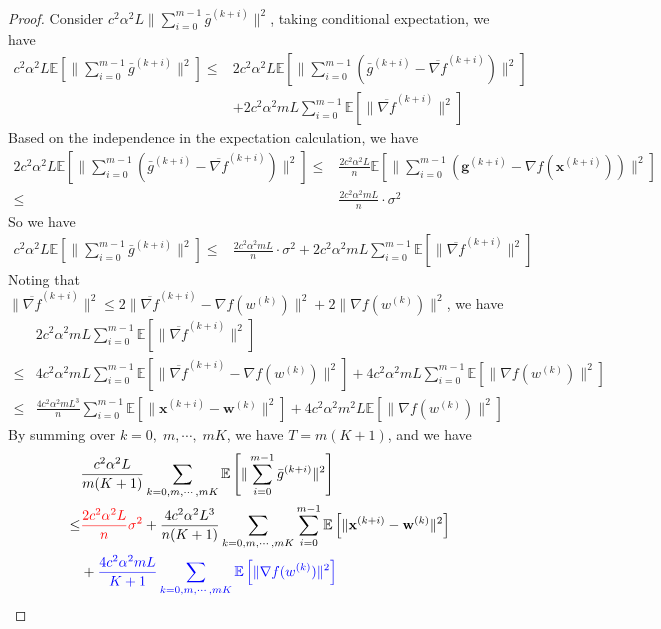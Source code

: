 \documentclass{article}
\newcommand{\vg}{{\mathbf{g}}}
\newcommand{\vw}{{\mathbf{w}}}
\newcommand{\vx}{{\mathbf{x}}}
\newcommand{\EE}[1]{\mathbb{E}\left[#1\right]}
\newcommand{\norm}[1]{\| #1 \|}
\begin{document}
\begin{proof}
Consider $c^2\alpha^2L\norm{\sum_{i=0}^{m-1}\bar{g}^{(k+i)}}^2$, taking conditional expectation, we have
\begin{align*}
  c^2\alpha^2L\EE{\norm{\sum_{i=0}^{m-1}\bar{g}^{(k+i)}}^2}\leq& 2c^2\alpha^2L\EE{\norm{\sum_{i=0}^{m-1}(\bar{g}^{(k+i)}-\overline{\nabla f}^{(k+i)})}^2}\\&+2c^2\alpha^2m L\sum_{i=0}^{m-1}\EE{\norm{\overline{\nabla f}^{(k+i)}}^2}
\end{align*}
Based on the independence in the expectation calculation, we have
\begin{align*}
  2c^2\alpha^2L\EE{\norm{\sum_{i=0}^{m-1}(\bar{g}^{(k+i)}-\overline{\nabla f}^{(k+i)})}^2}\leq &\frac{2c^2\alpha^2L}{n}\EE{\norm{\sum_{i=0}^{m-1}(\vg^{(k+i)}-\nabla f(\vx^{(k+i)}))}^2}\\
  \leq& \frac{2c^2\alpha^2mL}{n}\cdot \sigma^2
\end{align*}
So we have
\begin{align*}
  c^2\alpha^2L\EE{\norm{\sum_{i=0}^{m-1}\bar{g}^{(k+i)}}^2}\leq& \frac{2c^2\alpha^2mL}{n}\cdot \sigma^2+2c^2\alpha^2mL\sum_{i=0}^{m-1}\EE{\norm{\overline{\nabla f}^{(k+i)}}^2}
\end{align*}
Noting that $\norm{\overline{\nabla f}^{(k+i)}}^2\leq 2\norm{\overline{\nabla f}^{(k+i)}-\nabla f(w^{(k)})}^2+2\norm{\nabla f(w^{(k)})}^2$, we have
\begin{align*}
  &2c^2\alpha^2mL\sum_{i=0}^{m-1}\EE{\norm{\overline{\nabla f}^{(k+i)}}^2}\\ \leq& 4c^2\alpha^2mL\sum_{i=0}^{m-1}\EE{\norm{\overline{\nabla f}^{(k+i)}-\nabla f(w^{(k)})}^2}+4c^2\alpha^2mL\sum_{i=0}^{m-1}\EE{\norm{\nabla f(w^{(k)})}^2}\\ \leq&\frac{4c^2\alpha^2mL^3}{n}\sum_{i=0}^{m-1}\EE{\norm{\vx^{(k+i)}-\vw^{(k)}}^2}+4c^2\alpha^2m^2L\EE{\norm{\nabla f(w^{(k)})}^2}
\end{align*}
By summing over $k=0,\;m,\cdots,\;mK$, we have $T=m(K+1)$, and we have
\begin{align*}
  &\frac{c^2\alpha^2L}{m(K+1)}\sum_{k=0,m,\cdots,mK}\EE{\norm{\sum_{i=0}^{m-1}\bar{g}^{(k+i)}}^2}\\ \leq&\textcolor{red}{ \frac{2c^2\alpha^2L}{n}\sigma^2}+\frac{4c^2\alpha^2L^3}{n(K+1)}\sum_{k=0,m,\cdots,mK}\sum_{i=0}^{m-1}\EE{\norm{\vx^{(k+i)}-\vw^{(k)}}^2}\\&+ \textcolor{blue}{\frac{4c^2\alpha^2mL}{K+1}\sum_{k=0,m,\cdots,mK}\EE{\norm{\nabla f(w^{(k)})}^2}}
\end{align*}


\end{proof}
\end{document}
